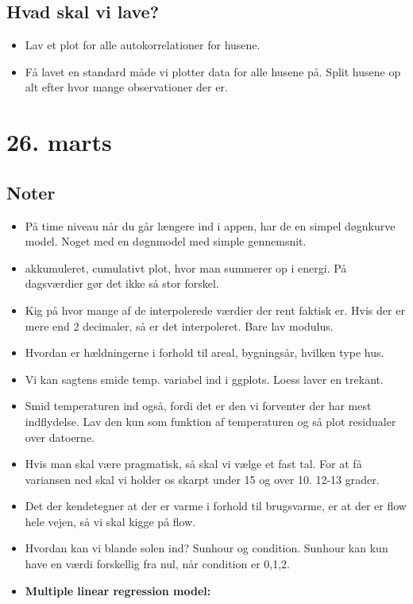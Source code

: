 \subsection{Hvad skal vi lave?}
\begin{itemize}
    \item Lav et plot for alle autokorrelationer for husene. 
    \item Få lavet en standard måde vi plotter data for alle husene på. Split husene op alt efter hvor mange observationer der er. 
\end{itemize}

\pagebreak

\section{26. marts}

\subsection{Noter}
\begin{itemize}
    \item På time niveau når du går længere ind i appen, har de en simpel døgnkurve model. Noget med en døgnmodel med simple gennemsnit. 
    \item akkumuleret, cumulativt plot, hvor man summerer op i energi. På dagsværdier gør det ikke så stor forskel. 
    \item Kig på hvor mange af de interpolerede værdier der rent faktisk er. Hvis der er mere end 2 decimaler, så er det interpoleret. Bare lav modulus. 
    \item Hvordan er hældningerne i forhold til areal, bygningsår, hvilken type hus. 
    \item Vi kan sagtens smide temp. variabel ind i ggplots. Loess laver en trekant.
    \item Smid temperaturen ind også, fordi det er den vi forventer der har mest indflydelse. Lav den kun som funktion af temperaturen og så plot residualer over datoerne. 
    \item Hvis man skal være pragmatisk, så skal vi vælge et fast tal. For at få variansen ned skal vi holder os skarpt under 15 og over 10. 12-13 grader. 
    \item Det der kendetegner at der er varme i forhold til brugsvarme, er at der er flow hele vejen, så vi skal kigge på flow. 
    \item Hvordan kan vi blande solen ind? Sunhour og condition. Sunhour kan kun have en værdi forskellig fra nul, når condition er 0,1,2. 
    \item \textbf{Multiple linear regression model:} 

\end{itemize}

